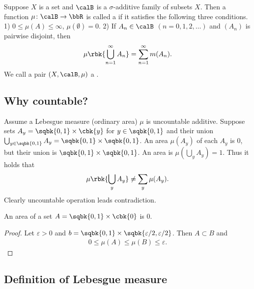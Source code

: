 \documentclass[openany, a4paper, oneside]{jsbook}
\begin{document}
\begin{defn}[Measure]
 Suppose $X$ is a set and $\calB$ is a $\sigma$-additive family of subsets $X$.
 Then a function $\mu \colon \calB \to \bbR$ is called a 
 if it satisfies the following three conditions.
 1)  $0 \leq \mu (A) \leq \infty$, $\mu (\emptyset) = 0$.
 2)  If $A_n \in \calB$ $(n = 0, 1, 2, \dots)$ and $(A_n)$ is pairwise disjoint, then
    \begin{align}
     \mu \rbk{\bigcup_{n=1}^{\infty} A_n} = \sum_{n=1}^{\infty} m (A_n).
    \end{align}
 We call a pair $(X, \calB, \mu)$ a .
\end{defn}
\subsection{Why countable?}

Assume a Lebesgue measure (ordinary area) $\mu$ is uncountable additive.
Suppose sets $A_y = \sqbk{0, 1} \times \cbk{y}$ for $y \in \sqbk{0, 1}$
and their union $\bigcup_{y \in \sqbk{0, 1}} A_y = \sqbk{0, 1} \times \sqbk{0, 1}$.
An area $\mu (A_y)$ of each $A_y$ is 0, but their union is $\sqbk{0, 1} \times \sqbk{0, 1}$.
An area is $\mu (\bigcup_y A_y) = 1$.
Thus it holds that
\begin{align}
 \mu \rbk{ \bigcup_y A_y}
 \neq
 \sum_y \mu (A_y).
\end{align}
Clearly uncountable operation leads contradiction.
\begin{prop}
 An area of a set $A = \sqbk{0, 1} \times \cbk{0}$ is $0$.
\end{prop}
\begin{proof}
Let $\varepsilon > 0$ and $b = \sqbk{0, 1} \times \sqbk{\varepsilon / 2, \varepsilon / 2}$.
Then $A \subset B$ and
\begin{align}
 0
 \leq
 \mu (A)
 \leq
 \mu (B)
 \leq
 \varepsilon.
\end{align}
\end{proof}
\subsection{Definition of Lebesgue measure}
\end{document}

